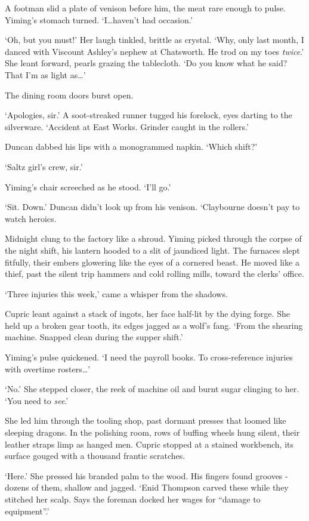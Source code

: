 A footman slid a plate of venison before him, the meat rare enough to pulse. Yiming's stomach turned. `I\dots haven't had occasion.'

`Oh, but you must!' Her laugh tinkled, brittle as crystal. `Why, only last month, I danced with Viscount Ashley's nephew at Chatsworth. He trod on my toes \textit{twice}.' She leant forward, pearls grazing the tablecloth. `Do you know what he said? That I'm as light as\dots'

The dining room doors burst open.

`Apologies, sir.' A soot-streaked runner tugged his forelock, eyes darting to the silverware. `Accident at East Works. Grinder caught in the rollers.'

Duncan dabbed his lips with a monogrammed napkin. `Which shift?'

`Saltz girl's crew, sir.'

Yiming's chair screeched as he stood. `I'll go.'

`Sit. Down.' Duncan didn't look up from his venison. `Claybourne doesn't pay to watch heroics.

 Midnight clung to the factory like a shroud. Yiming picked through the corpse of the night shift, his lantern hooded to a slit of jaundiced light. The furnaces slept fitfully, their embers glowering like the eyes of a cornered beast. He moved like a thief, past the silent trip hammers and cold rolling mills, toward the clerks' office.

`Three injuries this week,' came a whisper from the shadows.

Cupric leant against a stack of ingots, her face half-lit by the dying forge. She held up a broken gear tooth, its edges jagged as a wolf's fang. `From the shearing machine. Snapped clean during the supper shift.'

Yiming's pulse quickened. `I need the payroll books. To cross-reference injuries with overtime rosters\dots'

`No.' She stepped closer, the reek of machine oil and burnt sugar clinging to her. `You need to \textit{see}.'

She led him through the tooling shop, past dormant presses that loomed like sleeping dragons. In the polishing room, rows of buffing wheels hung silent, their leather straps limp as hanged men. Cupric stopped at a stained workbench, its surface gouged with a thousand frantic scratches.

`Here.' She pressed his branded palm to the wood. His fingers found grooves - dozens of them, shallow and jagged. `Enid Thompson carved these while they stitched her scalp. Says the foreman docked her wages for “damage to equipment”.'

